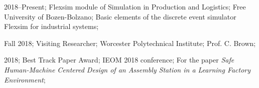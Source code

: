 \addteaching%
{%
    2018--Present;%
    Flexsim module of Simulation in Production and Logistics;%
    Free University of Bozen-Bolzano;%
    Basic elements of the discrete event simulator Flexsim for industrial systems;%
}%



\addvisit%
{%
    Fall 2018;%
    Visiting Researcher;%
    Worcester Polytechnical Institute;%
    Prof\@. C\@. Brown;%
}%
%
%
%

\addhonour%
{%
    2018;%
    Best Track Paper Award;%
    IEOM 2018 conference;%
    For the paper \emph{Safe Human-Machine Centered Design of an Assembly Station in a Learning Factory Environment};%
}%


